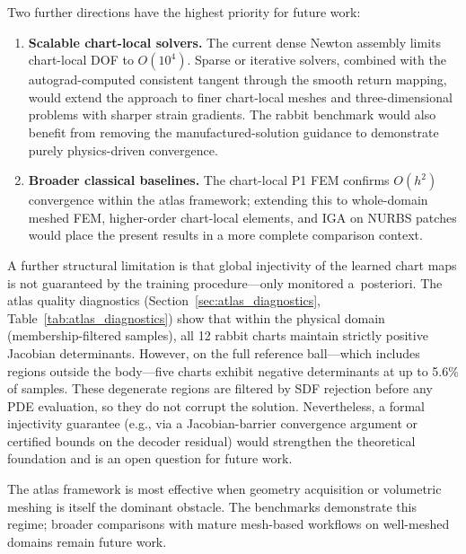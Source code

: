 \documentclass[sort&compress]{svjour3} %
\begin{document}
Two further directions have the highest priority for future work:
\begin{enumerate}[leftmargin=*]
\item \textbf{Scalable chart-local solvers.} The current dense Newton assembly limits chart-local DOF to $O(10^4)$. Sparse or iterative solvers, combined with the autograd-computed consistent tangent through the smooth return mapping, would extend the approach to finer chart-local meshes and three-dimensional problems with sharper strain gradients. The rabbit benchmark would also benefit from removing the manufactured-solution guidance to demonstrate purely physics-driven convergence.
\item \textbf{Broader classical baselines.} The chart-local P1 FEM confirms $O(h^2)$ convergence within the atlas framework; extending this to whole-domain meshed FEM, higher-order chart-local elements, and IGA on NURBS patches would place the present results in a more complete comparison context.
\end{enumerate}

A further structural limitation is that global injectivity of the learned chart maps is not guaranteed by the training procedure---only monitored a~posteriori. The atlas quality diagnostics (Section~\ref{sec:atlas_diagnostics}, Table~\ref{tab:atlas_diagnostics}) show that within the physical domain (membership-filtered samples), all 12 rabbit charts maintain strictly positive Jacobian determinants. However, on the full reference ball---which includes regions outside the body---five charts exhibit negative determinants at up to 5.6\% of samples. These degenerate regions are filtered by SDF rejection before any PDE evaluation, so they do not corrupt the solution. Nevertheless, a formal injectivity guarantee (e.g., via a Jacobian-barrier convergence argument or certified bounds on the decoder residual) would strengthen the theoretical foundation and is an open question for future work.

The atlas framework is most effective when geometry acquisition or volumetric meshing is itself the dominant obstacle. The benchmarks demonstrate this regime; broader comparisons with mature mesh-based workflows on well-meshed domains remain future work.
\end{document}
